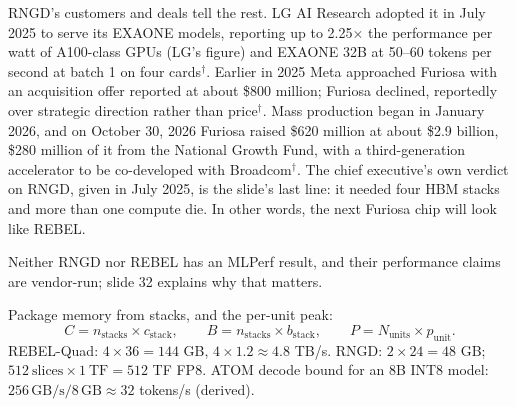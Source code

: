 \documentclass[11pt,letterpaper]{article}
\newenvironment{formulas}{\begin{tcolorbox}[formulabox]}{\end{tcolorbox}}
\begin{document}
RNGD's customers and deals tell the rest. LG AI Research adopted it in July 2025 to serve its EXAONE models, reporting up to 2.25$\times$ the performance per watt of A100-class GPUs (LG's figure) and EXAONE 32B at 50--60 tokens per second at batch 1 on four cards$^\dagger$. Earlier in 2025 Meta approached Furiosa with an acquisition offer reported at about \$800 million; Furiosa declined, reportedly over strategic direction rather than price$^\dagger$. Mass production began in January 2026, and on October 30, 2026 Furiosa raised \$620 million at about \$2.9 billion, \$280 million of it from the National Growth Fund, with a third-generation accelerator to be co-developed with Broadcom$^\dagger$. The chief executive's own verdict on RNGD, given in July 2025, is the slide's last line: it needed four HBM stacks and more than one compute die. In other words, the next Furiosa chip will look like REBEL.

Neither RNGD nor REBEL has an MLPerf result, and their performance claims are vendor-run; slide 32 explains why that matters.

\begin{formulas}
Package memory from stacks, and the per-unit peak:
\[
C = n_{\text{stacks}}\times c_{\text{stack}},\qquad B = n_{\text{stacks}}\times b_{\text{stack}},\qquad
P = N_{\text{units}}\times p_{\text{unit}} .
\]
REBEL-Quad: $4\times 36 = 144$ GB, $4\times 1.2\approx 4.8$ TB/s. RNGD: $2\times 24 = 48$ GB; $512\ \text{slices}\times 1\ \text{TF} = 512$ TF FP8. ATOM decode bound for an 8B INT8 model: $256\,\text{GB/s}/8\,\text{GB}\approx 32$ tokens/s (derived).
\end{formulas}
\end{document}

